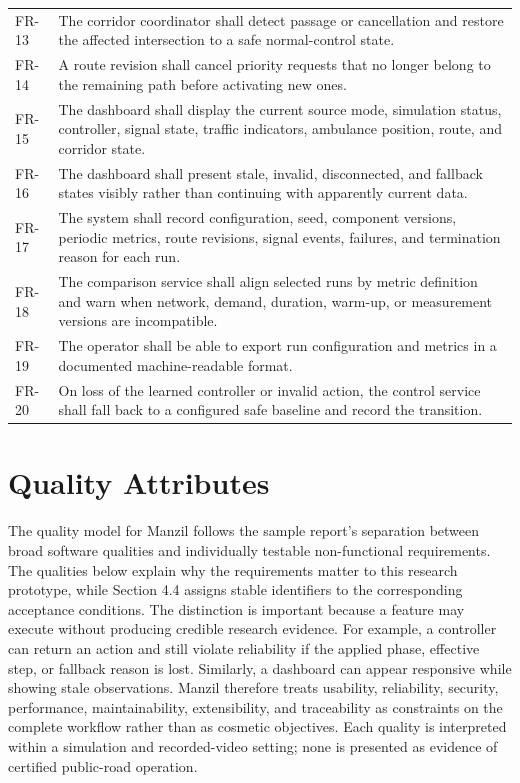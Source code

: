 \begin{longtable}{p{}p{}}
FR-13 & The corridor coordinator shall detect passage or cancellation and restore the affected intersection to a safe normal-control state.\\
FR-14 & A route revision shall cancel priority requests that no longer belong to the remaining path before activating new ones.\\
FR-15 & The dashboard shall display the current source mode, simulation status, controller, signal state, traffic indicators, ambulance position, route, and corridor state.\\
FR-16 & The dashboard shall present stale, invalid, disconnected, and fallback states visibly rather than continuing with apparently current data.\\
FR-17 & The system shall record configuration, seed, component versions, periodic metrics, route revisions, signal events, failures, and termination reason for each run.\\
FR-18 & The comparison service shall align selected runs by metric definition and warn when network, demand, duration, warm-up, or measurement versions are incompatible.\\
FR-19 & The operator shall be able to export run configuration and metrics in a documented machine-readable format.\\
FR-20 & On loss of the learned controller or invalid action, the control service shall fall back to a configured safe baseline and record the transition.\\
\bottomrule
\end{longtable}

\section{Quality Attributes}

The quality model for Manzil follows the sample report's separation between broad software qualities and individually testable non-functional requirements. The qualities below explain why the requirements matter to this research prototype, while Section 4.4 assigns stable identifiers to the corresponding acceptance conditions. The distinction is important because a feature may execute without producing credible research evidence. For example, a controller can return an action and still violate reliability if the applied phase, effective step, or fallback reason is lost. Similarly, a dashboard can appear responsive while showing stale observations. Manzil therefore treats usability, reliability, security, performance, maintainability, extensibility, and traceability as constraints on the complete workflow rather than as cosmetic objectives. Each quality is interpreted within a simulation and recorded-video setting; none is presented as evidence of certified public-road operation.

